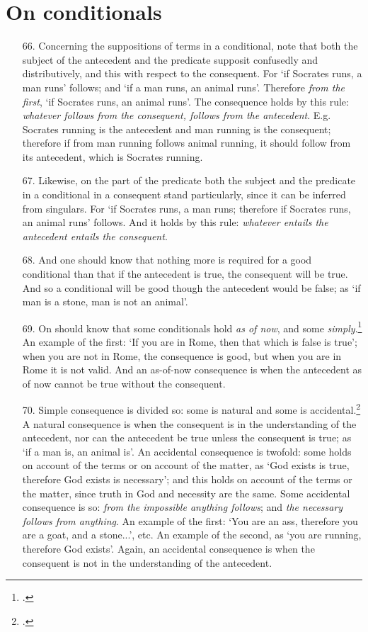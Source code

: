 \section{On conditionals}
\begin{itemize}
\item[66.] Concerning the suppositions of terms in a conditional, note that both the subject of the antecedent and the predicate supposit confusedly and distributively, and this with respect to the consequent. For `if Socrates runs, a man runs' follows; and `if a man runs, an animal runs'. Therefore \textit{from the first}, `if Socrates runs, an animal runs'. The consequence holds by this rule: \textit{whatever follows from the consequent, follows from the antecedent}. E.g. Socrates running is the antecedent and man running is the consequent; therefore if from man running follows animal running, it should follow from its antecedent, which is Socrates running.
\item[67.] Likewise, on the part of the predicate both the subject and the predicate in a conditional in a consequent stand particularly, since it can be inferred from singulars. For `if Socrates runs, a man runs; therefore if Socrates runs, an animal runs' follows. And it holds by this rule: \textit{whatever entails the antecedent entails the consequent}.
\item[68.] And one should know that nothing more is required for a good conditional than that if the antecedent is true, the consequent will be true. And so a conditional will be good though the antecedent would be false; as `if man is a stone, man is not an animal'.
\item[69.] On should know that some conditionals hold \textit{as of now}, and some \textit{simply}.\footnote{\cite[p. 60.28]{BurleyDPAL}.} An example of the first: `If you are in Rome, then that which is false is true'; when you are not in Rome, the consequence is good, but when you are in Rome it is not valid. And an as-of-now consequence is when the antecedent as of now cannot be true without the consequent.
\item[70.] Simple consequence is divided so: some is natural and some is accidental.\footnote{\cite[p. 61.6]{BurleyDPAL}.} A natural consequence is when the consequent is in the understanding of the antecedent, nor can the antecedent be true unless the consequent is true; as `if a man is, an animal is'. An accidental consequence is twofold: some holds on account of the terms or on account of the matter, as `God exists is true, therefore God exists is necessary'; and this holds on account of the terms or the matter, since truth in God and necessity are the same. Some accidental consequence is so: \textit{from the impossible anything follows}; and \textit{the necessary follows from anything}. An example of the first: `You are an ass, therefore you are a goat, and a stone...', etc. An example of the second, as `you are running, therefore God exists'. Again, an accidental consequence is when the consequent is not in the understanding of the antecedent.

\end{itemize}
